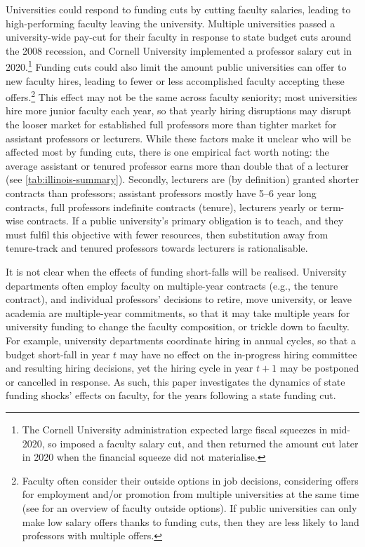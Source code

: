 Universities could respond to funding cuts by cutting faculty salaries, leading to high-performing faculty leaving the university.
Multiple universities passed a university-wide pay-cut for their faculty in response to state budget cuts around the 2008 recession, and Cornell University implemented a professor salary cut in 2020.\footnote{
    The Cornell University administration expected large fiscal squeezes in mid-2020, so imposed a faculty salary cut, and then returned the amount cut later in 2020 when the financial squeeze did not materialise.}
Funding cuts could also limit the amount public universities can offer to new faculty hires, leading to fewer or less accomplished faculty accepting these offers.\footnote{
    Faculty often consider their outside options in job decisions, considering offers for employment and/or promotion from multiple universities at the same time (see \citealt{blackaby2005} for an overview of faculty outside options).
    If public universities can only make low salary offers thanks to funding cuts, then they are less likely to land professors with multiple offers.
}
This effect may not be the same across faculty seniority; most universities hire more junior faculty each year, so that yearly hiring disruptions may disrupt the looser market for established full professors more than tighter market for assistant professors or lecturers.
While these factors make it unclear who will be affected most by funding cuts, there is one empirical fact worth noting: the average assistant or tenured professor earns more than double that of a lecturer (see \autoref{tab:illinois-summary}).
Secondly, lecturers are (by definition) granted shorter contracts than professors; assistant professors mostly have 5--6 year long contracts, full professors indefinite contracts (tenure), lecturers yearly or term-wise contracts.
If a public university's primary obligation is to teach, and they must fulfil this objective with fewer resources, then substitution away from tenure-track and tenured professors towards lecturers is rationalisable.

It is not clear when the effects of funding short-falls will be realised.
University departments often employ faculty on multiple-year contracts (e.g., the tenure contract), and individual professors' decisions to retire, move university, or leave academia are multiple-year commitments, so that it may take multiple years for university funding to change the faculty composition, or trickle down to faculty.
For example, university departments coordinate hiring in annual cycles, so that a budget short-fall in year $t$ may have no effect on the in-progress hiring committee and resulting hiring decisions, yet the hiring cycle in year $t+1$ may be postponed or cancelled in response.
As such, this paper investigates the dynamics of state funding shocks' effects on faculty, for the years following a state funding cut.
